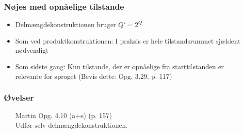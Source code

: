\begin{frame}
\frametitle{Nøjes med opnåelige tilstande}
\begin{itemize}[<+->]
\item Delmængdekonstruktionen bruger $Q' = 2^Q$
\item Som ved produktkonstruktionen: I praksis er hele tilstandsrummet
  sjældent nødvendigt
\item Som sidste gang: Kun tilstande, der er opnåelige fra
  starttilstanden er relevante for sproget (Bevis dette: Opg. 3.29, p. 117)
\end{itemize}
\end{frame}
\begin{frame}
\frametitle{Øvelser}
\begin{itemize}
\item [Martin] Opg. 4.10 (a+e) (p. 157)\\
Udfør selv delmængdekonstruktionen.
\end{itemize}
\end{frame}